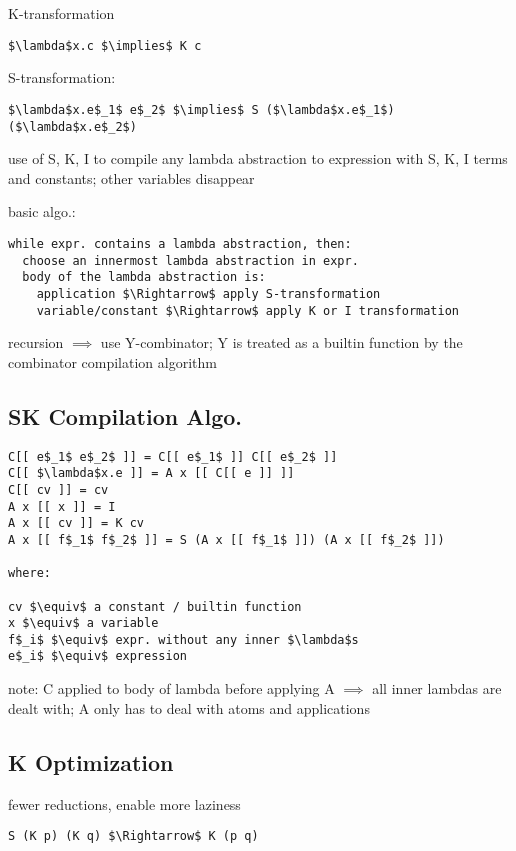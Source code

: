 \documentclass[8pt]{extarticle}
\begin{document}
\begin{multicols*}{2}
\begin{tblr}[]{}
K-transformation
\begin{lstlisting}
$\lambda$x.c $\implies$ K c
\end{lstlisting}

S-transformation:
\begin{lstlisting}
$\lambda$x.e$_1$ e$_2$ $\implies$ S ($\lambda$x.e$_1$)($\lambda$x.e$_2$)
\end{lstlisting}

use of S, K, I to compile any lambda abstraction to expression with S, K, I terms and constants; other variables disappear

basic algo.:
\begin{lstlisting}
while expr. contains a lambda abstraction, then:
  choose an innermost lambda abstraction in expr.
  body of the lambda abstraction is:
    application $\Rightarrow$ apply S-transformation
    variable/constant $\Rightarrow$ apply K or I transformation
\end{lstlisting}

recursion $\implies$ use Y-combinator; Y is treated as a builtin function by the combinator compilation algorithm

\subsection{SK Compilation Algo.}
\begin{lstlisting}
C[[ e$_1$ e$_2$ ]] = C[[ e$_1$ ]] C[[ e$_2$ ]]
C[[ $\lambda$x.e ]] = A x [[ C[[ e ]] ]]
C[[ cv ]] = cv
A x [[ x ]] = I
A x [[ cv ]] = K cv
A x [[ f$_1$ f$_2$ ]] = S (A x [[ f$_1$ ]]) (A x [[ f$_2$ ]])

where:

cv $\equiv$ a constant / builtin function
x $\equiv$ a variable
f$_i$ $\equiv$ expr. without any inner $\lambda$s
e$_i$ $\equiv$ expression
\end{lstlisting}

note: C applied to body of lambda before applying A $\implies$ all inner lambdas are dealt with; A only has to deal with atoms and applications

\subsection{K Optimization}

fewer reductions, enable more laziness

\begin{lstlisting}
S (K p) (K q) $\Rightarrow$ K (p q)
\end{lstlisting}


\end{tblr}
\end{multicols*}
\end{document}
